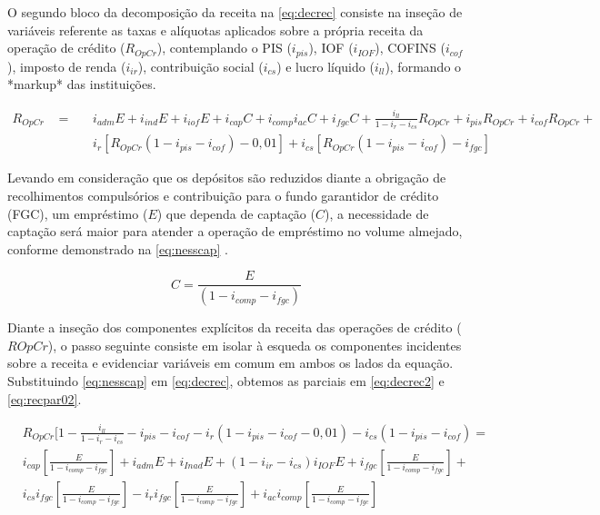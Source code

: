 \documentclass[
  12pt,
  12pt,
  openright,
  oneside,
  a4paper,
  chapter=TITLE,
  section=TITLE,
  subsection=TITLE,
  subsubsection=TITLE,
  english,
  portugues,
  sumario=tradicional]{abntex2}
\begin{document}
\begin{apendicesenv}
O segundo bloco da decomposição da receita na \autoref{eq:decrec} consiste na inseção de variáveis referente as taxas e alíquotas aplicados sobre a própria receita da operação de crédito ($R_{OpCr}$), contemplando o PIS ($i_{pis}$), IOF ($i_{IOF}$), COFINS ($i_{cof}$), imposto de renda ($i_{ir}$), contribuição social ($i_{cs}$) e lucro líquido ($i_{ll}$), formando o *markup* das instituições.


\begin{equation}\label{eq:decrec}
\begin{aligned}
R_{OpCr} \hspace{10pt} = \hspace{10pt} &  i_{adm}E + i_{ind}E + i_{iof}E + i_{cap}C + i_{comp}i_{ac}C + i_{fgc}C + \frac{i_{ll}}{1 - i_{r} - i_{cs}}R_{OpCr} + i_{pis}R_{OpCr} + i_{cof}R_{OpCr} + \\ 
& i_{r} [R_{OpCr}(1-i_{pis} - i_{cof}) - 0,01] + i_{cs} [R_{OpCr}(1-i_{pis} - i_{cof}) - i_{fgc}]
\end{aligned}
\end{equation}


Levando em consideração que os depósitos são reduzidos diante a obrigação de recolhimentos compulsórios e contribuição para o fundo garantidor de crédito (FGC), um empréstimo ($E$) que dependa de captação ($C$), a necessidade de captação será maior para atender a operação de empréstimo no volume almejado, conforme demonstrado na \autoref{eq:nesscap} \cite{cardoso:1999}.


\begin{equation}\label{eq:nesscap}
C = \frac{E}{(1 - i_{comp} - i_{fgc})}
\end{equation}


Diante a inseção dos componentes explícitos da receita das operações de crédito ($ROpCr$), o passo seguinte consiste em isolar à esqueda os componentes incidentes sobre a receita e evidenciar variáveis em comum em ambos os lados da equação. Substituindo \autoref{eq:nesscap} em \autoref{eq:decrec}, obtemos as parciais em \autoref{eq:decrec2} e \autoref{eq:recpar02}. 


\begin{equation}\label{eq:decrec2}
\begin{aligned}
& R_{OpCr}[1 - \frac{i_{ll}}{1 - i_{r} - i_{cs}} - i_{pis} - i_{cof} - i_{r} (1-i_{pis} - i_{cof} - 0,01) - i_{cs} (1-i_{pis} - i_{cof}) = \\
& i_{cap}[\frac{E}{1 - i_{comp} - i_{fgc}}] + i_{adm}E + i_{Inad}E + (1 - i_{ir} - i_{cs})i_{IOF}E + i_{fgc}[\frac{E}{1 - i_{comp} - i_{fgc}}] + \\ & i_{cs}i_{fgc}[\frac{E}{1 - i_{comp} - i_{fgc}}] - 
i_{r}i_{fgc}[\frac{E}{1 - i_{comp} - i_{fgc}}] + i_{ac}i_{comp}[\frac{E}{1 - i_{comp} - i_{fgc}}]
\end{aligned}
\end{equation}




\end{apendicesenv}
\end{document}
